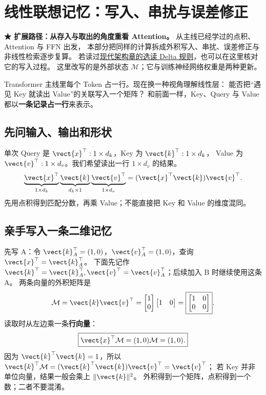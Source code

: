 \chapterrule
\section{线性联想记忆：写入、串扰与误差修正}
\label{intro:04-key-value-outer-product}
\label{intro:06-better-linear-memory}

\label{concept:outer-product}

\noindent\textbf{{\symboliconfont ★} 扩展路径：从存入与取出的角度重看 Attention。}
从主线已经学过的点积、Attention 与 FFN 出发，
本部分把同样的计算拆成外积写入、串扰、误差修正与非线性检索逐步复算。
若读过\hyperref[sec:modern-delta-rule]{现代架构章的选读 Delta 规则}，也可以在这里核对它的写入过程。
这里改写的是外部状态 $\mathcal{M}$；它与训练神经网络权重是两种更新。

Transformer 主线里每个 Token 占一行。现在换一种视角理解线性层：
能否把“遇见 Key 就读出 Value”的关联写入一个矩阵？
和前面一样，Key、Query 与 Value 都以\textbf{一条记录占一行}来表示。

\subsection{先问输入、输出和形状}
单次 Query 是 $\vect{x}^\top:1\times d_k$，Key 为 $\vect{k}^\top:1\times d_k$，
Value 为 $\vect{v}^\top:1\times d_v$。我们希望读出一行 $1\times d_v$ 的结果。
\[
\underbrace{\vect{x}^\top}_{1\times d_k}
\underbrace{\vect{k}}_{d_k\times1}
\underbrace{\vect{v}^\top}_{1\times d_v}
=(\vect{x}^\top\vect{k})\vect{v}^\top.
\]
先用点积得到匹配分数，再乘 Value；不能直接把 Key 和 Value 的维度混同。

\subsection{亲手写入一条二维记忆}
先写 A：令 $\vect{k}_A^\top=(1,0)$，$\vect{v}_A^\top=(1,0)$，查询 $\vect{x}^\top=\vect{k}_A^\top$。
下面先记作 $\vect{k}^\top=\vect{k}_A^\top,\vect{v}^\top=\vect{v}_A^\top$；后续加入 B 时继续使用这条 A。
两条向量的外积矩阵是
\[
\mathcal{M}=\vect{k} \vect{v}^\top
=\begin{bmatrix}1\\0\end{bmatrix}
\begin{bmatrix}1&0\end{bmatrix}
=\boxed{\begin{bmatrix}1&0\\0&0\end{bmatrix}}.
\]
读取时从左边乘一条\textbf{行向量}：
\begin{equation}
\boxed{\vect{x}^\top\mathcal{M}=(1,0)\mathcal{M}=(1,0).}
\end{equation}
因为 $\vect{k}^\top\vect{k}=1$，所以 $\vect{k}^\top\mathcal{M}=(\vect{k}^\top\vect{k})\vect{v}^\top=\vect{v}^\top$；
若 Key 并非单位向量，结果一般会乘上 $\|\vect{k}\|^2$。
外积得到一个矩阵，点积得到一个数；二者不要混淆。

